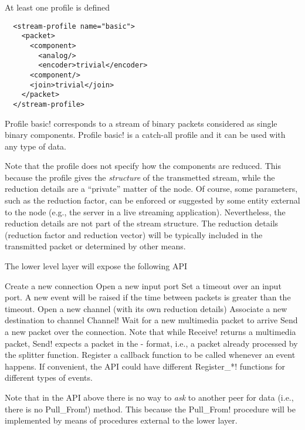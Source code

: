 \documentclass{article}
\begin{document}
At least one profile is defined

\begin{verbatim}
  <stream-profile name="basic">
    <packet>
      <component>
        <analog/>
        <encoder>trivial</encoder>
      <component/>
      <join>trivial</join>
    </packet>
  </stream-profile>
\end{verbatim}

Profile \ttt basic! corresponds to a stream of binary packets
considered as single binary components.  Profile \ttt basic! is a
catch-all profile and it can be used with any type of data.

Note that the profile does not specify how the components are reduced.
This because the profile gives the \emph{structure} of the transmetted
stream, while the reduction details are a ``private'' matter of the
node. Of course, some parameters, such as the reduction factor, can be
enforced or suggested by some entity external to the node (e.g., the
server in a live streaming application).  Nevertheless, the reduction
details are not part of the stream structure.  The reduction details
(reduction factor and reduction vector) will be typically included in
the transmitted packet or determined by other means.

The lower level layer will expose the following API

\begin{API}
   Create a new connection
   Open a new input port
   Set a timeout over an input port.  A
  new event will be raised if the time between packets is greater than
  the timeout.
   Open a new channel (with its own
  reduction details)
   Associate a new
  destination to channel \ttt Channel!
   Wait for a new multimedia
  packet to arrive
   Send a new packet over
  the connection.  Note that while \ttt Receive! returns a multimedia
  packet, \ttt Send! expects a packet in the \medusa- format, i.e., a
  packet already processed by the splitter function.  
   Register a callback function to be
  called whenever an event happens.  If convenient, the API could have
  different \ttt Register_*! functions for different types of events.
\end{API}
%
Note that in the API above there is no way to \emph{ask} to another
peer for data (i.e., there is no \ttt Pull_From!) method.  This
because the \ttt Pull_From! procedure will be implemented by means of
procedures external to the lower layer.
\end{document}
